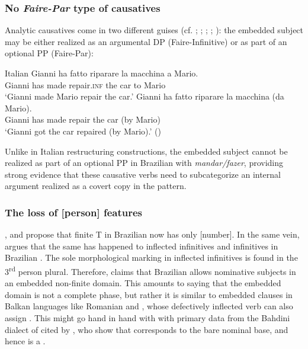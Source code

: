 \documentclass[output=paper]{langsci/langscibook}
\begin{document}
\subsubsection{No \textit{Faire-Par} type of causatives} %

Analytic causatives come in two different guises (cf. \citealt{Kayne1975}; \citealt{Huber1980}; \citealt{Burzio1986}; \citealt{Enzinger2010}; \citealt{Campanini2012}): the embedded subject may be either realized as an argumental DP  (Faire-Infinitive) or as part of an optional  PP (Faire-Par):

\ea%
         Italian\label{ex:moreno:18}
    \ea  
    \gll Gianni ha  fatto   riparare    la   macchina a Mario.\\
         Gianni has made repair.\textsc{inf} the car    to Mario \\
    \glt ‘Gianni made Mario repair the car.’
    \ex  
    \gll Gianni ha fatto    riparare   la  macchina   (da Mario). \\
         Gianni has made repair   the car  (by Mario) \\
    \glt ‘Gianni got the car repaired (by Mario).’ (\citealt{Campanini2012})
    \z
\z

Unlike in Italian restructuring constructions, the embedded subject cannot be realized as part of an optional  PP in Brazilian  with \textit{mandar\slash fazer}, providing strong evidence that these causative verbs need to subcategorize an internal argument realized as a covert copy in the  pattern. 

    \z



\subsubsection{The loss of [person] features}%

\citet{Nunes2008}, \citet{Ferreira2009} and \citet{Rodrigues2004} propose that finite T in Brazilian  now has only [number]. In the same vein, \citet{Cyrino2010} argues that the same has happened to inflected infinitives and  infinitives in Brazilian . The sole morphological marking in inflected infinitives is found in the 3\textsuperscript{rd} person plural. Therefore, \citet{Cyrino2010} claims that Brazilian  allows nominative subjects in an embedded non-finite domain. This amounts to saying that the embedded domain is not a complete phase, but rather it is similar to embedded  clauses in Balkan languages like Romanian and , whose defectively inflected verb can also assign . This might go hand in hand with with primary data from the Bahdini dialect of   cited by \citet{Manzini2017}, who show that  corresponds to the bare nominal base, and hence is a .  
\end{document}
